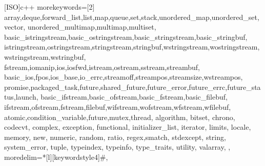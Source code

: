 [ISO]{c++}
{
    morekeywords=[2]{
        array,deque,forward_list,list,map,queue,set,stack,unordered_map,unordered_set,vector,
        unordered_multimap,multimap,multiset,
        basic_istringstream,basic_ostringstream,basic_stringstream,basic_stringbuf,
        istringstream,ostringstream,stringstream,stringbuf,wstringstream,wostringstream,wstringstream,wstringbuf,
        fstream,iomanip,ios,iosfwd,istream,ostream,sstream,streambuf,
        basic_ios,fpos,ios_base,io_errc,streamoff,streampos,streamsize,wstreampos,
        promise,packaged_task,future,shared_future,future_error,future_errc,future_status,launch,
        basic_ifstream,basic_ofstream,basic_fstream,basic_filebuf,
        ifstream,ofstream,fstream,filebuf,wifstream,wofstream,wfstream,wfilebuf,
        atomic,condition_variable,future,mutex,thread,
        algorithm,
        bitset,
        chrono,
        codecvt,
        complex,
        exception,
        functional,
        initializer_list,
        iterator,
        limits,
        locale,
        memory,
        new,
        numeric,
        random,
        ratio,
        regex,smatch,
        stdexcept,
        string,
        system_error,
        tuple,
        typeindex,
        typeinfo,
        type_traits,
        utility,
        valarray,
    },
    moredelim=*[l][keywordstyle4]{\#},
}

